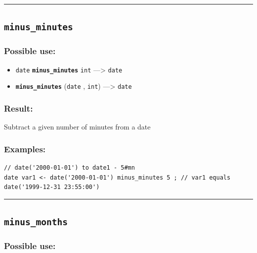 \documentclass[]{book}
\providecommand{\tightlist}{%
  \setlength{\itemsep}{0pt}\setlength{\parskip}{0pt}}
\theoremstyle{definition}
\theoremstyle{definition}
\theoremstyle{definition}
\theoremstyle{remark}
\begin{document}
\begin{center}\rule{0.5\linewidth}{\linethickness}\end{center}

\subsection{\texorpdfstring{\texttt{minus\_minutes}}{minus\_minutes}}\label{minus_minutes}

\subsubsection{Possible use:}\label{possible-use-355}

\begin{itemize}
\tightlist
\item
  \texttt{date} \textbf{\texttt{minus\_minutes}} \texttt{int}
  ---\textgreater{} \texttt{date}
\item
  \textbf{\texttt{minus\_minutes}} (\texttt{date} , \texttt{int})
  ---\textgreater{} \texttt{date}
\end{itemize}

\subsubsection{Result:}\label{result-344}

Subtract a given number of minutes from a date

\subsubsection{Examples:}\label{examples-245}

\begin{verbatim}
// date('2000-01-01') to date1 - 5#mn  
date var1 <- date('2000-01-01') minus_minutes 5 ; // var1 equals date('1999-12-31 23:55:00')
\end{verbatim}

\begin{center}\rule{0.5\linewidth}{\linethickness}\end{center}

\subsection{\texorpdfstring{\texttt{minus\_months}}{minus\_months}}\label{minus_months}

\subsubsection{Possible use:}\label{possible-use-356}
\end{document}
